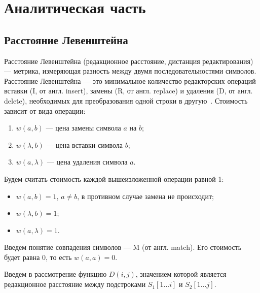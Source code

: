 \chapter{Аналитическая часть}
\section{Расстояние Левенштейна}

Расстояние Левенштейна (редакционное расстояние, дистанция редактирования) --- метрика, измеряющая разность между двумя последовательностями символов.
Расстояние Левенштейна --- это минимальное количество редакторских операций вставки (I, от англ. insert), замены (R, от англ. replace) и удаления (D, от англ. delete), необходимых для преобразования одной строки в другую~\cite{levenshtein}.
Стоимость зависит от вида операции:
\begin{enumerate}[label=\arabic*)]
	\item $w(a, b)$ --- цена замены символа $a$ на $b$;
	\item $w(\lambda, b)$ --- цена вставки символа $b$;
	\item $w(a, \lambda)$ --- цена удаления символа $a$.
\end{enumerate}

Будем считать стоимость каждой вышеизложенной операции равной 1:
\begin{itemize}[label=---]
	\item $w(a, b) = 1$, $a \neq b$, в противном случае замена не происходит;
	\item $w(\lambda, b) = 1$;
	\item $w(a, \lambda) = 1$.
\end{itemize}

Введем понятие совпадения символов --- M (от англ. match). Его стоимость будет равна 0, то есть $w(a, a) = 0$.

Введем в рассмотрение функцию $D(i, j)$, значением которой является
редакционное расстояние между подстроками $S_1[1...i]$ и $S_2[1...j]$.

